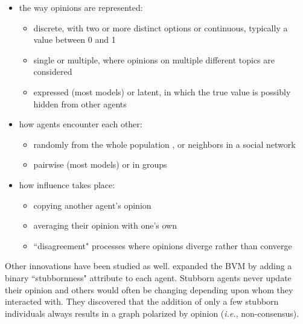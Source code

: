 \begin{itemize}
\item the way opinions are represented:
    \begin{itemize}
    \item discrete, with two or more distinct options \cite{follmer_random_1974,yildiz_discrete_2011} or
    continuous, typically a value between 0 and 1 \cite{ghaderi_opinion_2012,weisbuch_interacting_2001}

    \item single \cite{weisbuch_dynamical_1999} or
    multiple, where opinions on multiple different topics are considered \cite{deffuant_mixing_2000,sirbu_opinion_2013}

    \item expressed (most models) or latent, in which the true value is possibly hidden from other agents \cite{friedkin_social_1990}
    \end{itemize}

\item how agents encounter each other:
    \begin{itemize}
    \item randomly from the whole population \cite{hegselmann_opinion_2002}, or %
    neighbors in a social network \cite{clifford_model_1973,holley_ergodic_1975}
    \item pairwise (most models) or in groups \cite{degroot_reaching_1974}
    
    \end{itemize}
\item how influence takes place:
    \begin{itemize}
    \item copying another agent's opinion \cite{holley_ergodic_1975}
    \item averaging their opinion with one's own \cite{degroot_reaching_1974}
    \item ``disagreement" processes where opinions diverge rather than
converge\cite{sirbu_opinion_2013}
    \end{itemize}

\end{itemize}

Other innovations have been studied as well. 
\cite{yildiz_discrete_2011} expanded the BVM by adding a binary
``stubbornness" attribute to each agent. Stubborn agents never update their
opinion and 
others would often be changing depending upon whom they interacted with. They
discovered that the addition of only a few stubborn individuals always
results in a graph polarized by opinion (\textit{i.e.}, non-consensus).

